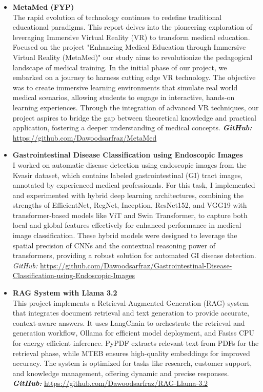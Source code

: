 \documentclass[a4paper,12pt]{article}
\begin{document}
\begin{itemize}
\item \textbf{MetaMed (FYP)} \\
The rapid evolution of technology continues to redefine traditional educational paradigms. This report delves into the pioneering exploration of leveraging Immersive Virtual Reality (VR) to transform medical education. Focused on the project "Enhancing Medical Education through Immersive Virtual Reality (MetaMed)" our study aims to revolutionize the pedagogical landscape of medical training. In the initial phase of our project, we embarked on a journey to harness cutting edge VR technology. The objective was to create immersive learning environments that simulate real world medical scenarios, allowing students to engage in interactive, hands-on learning experiences. Through the integration of advanced VR techniques, our project aspires to bridge the gap between theoretical knowledge and practical application, fostering a deeper understanding of medical concepts.
\textbf{\textit{GitHub:}} \url{https://github.com/Dawoodsarfraz/MetaMed}

\item \textbf{Gastrointestinal Disease Classification using Endoscopic Images} \\
I worked on automatic disease detection using endoscopic images from the Kvasir dataset, which contains labeled gastrointestinal (GI) tract images, annotated by experienced medical professionals. For this task, I implemented and experimented with hybrid deep learning architectures, combining the strengths of EfficientNet, RegNet, Inception, ResNet152, and VGG19 with transformer-based models like ViT and Swin Transformer, to capture both local and global features effectively for enhanced performance in medical image classification. These hybrid models were designed to leverage the spatial precision of CNNs and the contextual reasoning power of transformers, providing a robust solution for automated GI disease detection. \\
\textit{GitHub:} \url{https://github.com/Dawoodsarfraz/Gastrointestinal-Disease-Classification-using-Endoscopic-Images}
	
\item \textbf{RAG System with Llama 3.2} \\
This project implements a Retrieval-Augmented Generation (RAG) system that integrates document retrieval and text generation to provide accurate, context-aware answers. It uses LangChain to orchestrate the retrieval and generation workflow, Ollama for efficient model deployment, and Fasiss CPU for energy efficient inference. PyPDF extracts relevant text from PDFs for the retrieval phase, while MTEB ensures high-quality embeddings for improved accuracy. The system is optimized for tasks like research, customer support, and knowledge management, offering dynamic and precise responses. \\
\textbf{\textit{GitHub:}} \href{https://github.com/Dawoodsarfraz/RAG-Llama-3.2}{https://github.com/Dawoodsarfraz/RAG-Llama-3.2}



\end{itemize}
\end{document}
